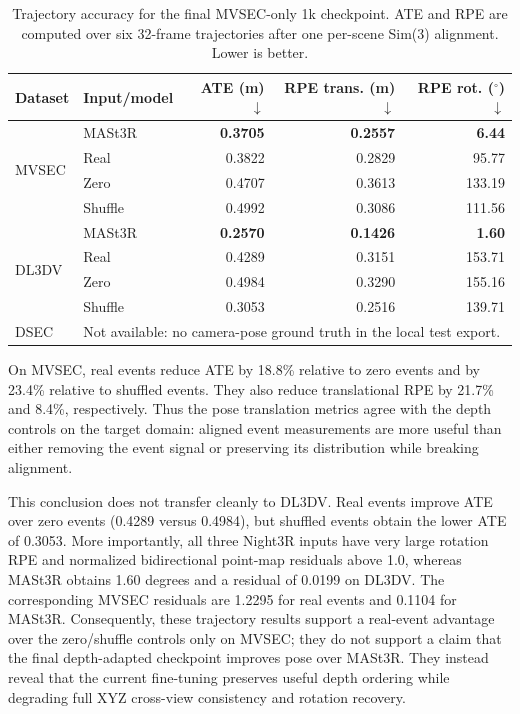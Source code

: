 \begin{table}[t]
\centering
\caption{Trajectory accuracy for the final MVSEC-only 1k checkpoint.  ATE and
RPE are computed over six 32-frame trajectories after one per-scene Sim(3)
alignment.  Lower is better.}
\label{tab:event-control-pose}
\begin{tabular}{llrrr}
\toprule
Dataset & Input/model & ATE (m) $\downarrow$ & RPE trans. (m) $\downarrow$ & RPE rot. ($^\circ$) $\downarrow$ \\
\midrule
\multirow{4}{*}{MVSEC} & MASt3R & \textbf{0.3705} & \textbf{0.2557} & \textbf{6.44} \\
 & Real & 0.3822 & 0.2829 & 95.77 \\
 & Zero & 0.4707 & 0.3613 & 133.19 \\
 & Shuffle & 0.4992 & 0.3086 & 111.56 \\
\midrule
\multirow{4}{*}{DL3DV} & MASt3R & \textbf{0.2570} & \textbf{0.1426} & \textbf{1.60} \\
 & Real & 0.4289 & 0.3151 & 153.71 \\
 & Zero & 0.4984 & 0.3290 & 155.16 \\
 & Shuffle & 0.3053 & 0.2516 & 139.71 \\
\midrule
DSEC & \multicolumn{4}{l}{Not available: no camera-pose ground truth in the local test export.} \\
\bottomrule
\end{tabular}
\end{table}

On MVSEC, real events reduce ATE by 18.8\% relative to zero events and by
23.4\% relative to shuffled events.  They also reduce translational RPE by
21.7\% and 8.4\%, respectively.  Thus the pose translation metrics agree with
the depth controls on the target domain: aligned event measurements are more
useful than either removing the event signal or preserving its distribution
while breaking alignment.

This conclusion does not transfer cleanly to DL3DV.  Real events improve ATE
over zero events (0.4289 versus 0.4984), but shuffled events obtain the lower
ATE of 0.3053.  More importantly, all three Night3R inputs have very large
rotation RPE and normalized bidirectional point-map residuals above 1.0,
whereas MASt3R obtains 1.60 degrees and a residual of 0.0199 on DL3DV.  The
corresponding MVSEC residuals are 1.2295 for real events and 0.1104 for MASt3R.
Consequently, these trajectory results support a real-event advantage over the
zero/shuffle controls only on MVSEC; they do not support a claim that the final
depth-adapted checkpoint improves pose over MASt3R.  They instead reveal that
the current fine-tuning preserves useful depth ordering while degrading full
XYZ cross-view consistency and rotation recovery.

